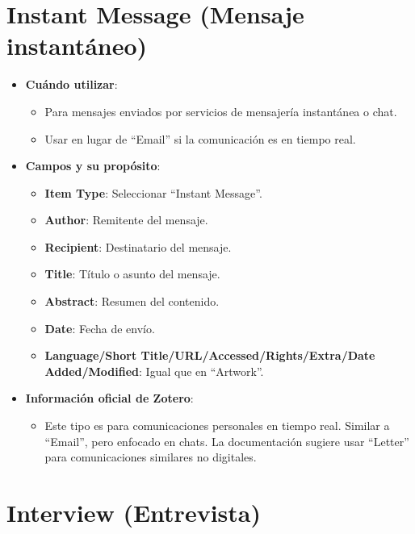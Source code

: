 \documentclass[
  jou,
  floatsintext,
  longtable,
  a4paper,
  nolmodern,
  notxfonts,
  notimes,
  12pt,
  colorlinks=true,linkcolor=blue,citecolor=blue,urlcolor=blue]{apa7}
\providecommand{\tightlist}{%
  \setlength{\itemsep}{0pt}\setlength{\parskip}{0pt}}
\begin{document}
\section{Instant Message (Mensaje
instantáneo)}\label{instant-message-mensaje-instantuxe1neo}

\begin{itemize}
\tightlist
\item
  \textbf{Cuándo utilizar}:

  \begin{itemize}
  \tightlist
  \item
    Para mensajes enviados por servicios de mensajería instantánea o
    chat.
  \item
    Usar en lugar de ``Email'' si la comunicación es en tiempo real.
  \end{itemize}
\item
  \textbf{Campos y su propósito}:

  \begin{itemize}
  \tightlist
  \item
    \textbf{Item Type}: Seleccionar ``Instant Message''.
  \item
    \textbf{Author}: Remitente del mensaje.
  \item
    \textbf{Recipient}: Destinatario del mensaje.
  \item
    \textbf{Title}: Título o asunto del mensaje.
  \item
    \textbf{Abstract}: Resumen del contenido.
  \item
    \textbf{Date}: Fecha de envío.
  \item
    \textbf{Language/Short Title/URL/Accessed/Rights/Extra/Date
    Added/Modified}: Igual que en ``Artwork''.
  \end{itemize}
\item
  \textbf{Información oficial de Zotero}:

  \begin{itemize}
  \tightlist
  \item
    Este tipo es para comunicaciones personales en tiempo real. Similar
    a ``Email'', pero enfocado en chats. La documentación sugiere usar
    ``Letter'' para comunicaciones similares no digitales.
  \end{itemize}
\end{itemize}

\section{Interview (Entrevista)}\label{interview-entrevista}
\end{document}
